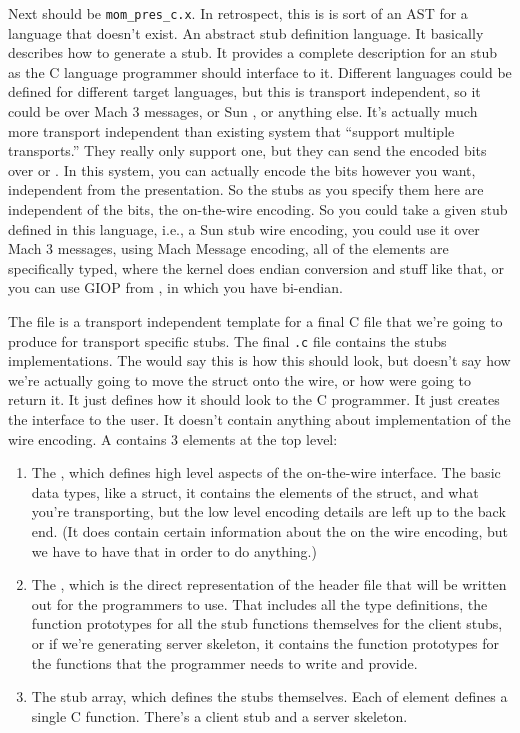 Next should be \texttt{mom\_pres\_c.x}.  In retrospect, this is is sort of an
AST for a language that doesn't exist.  An abstract stub definition language.
It basically describes how to generate a stub.  It provides a complete
description for an \RPC{} stub as the C language programmer should interface to
it.  Different languages could be defined for different target languages, but
this is transport independent, so it could be over \TCP{} Mach 3 messages, or Sun
\RPC{}, or anything else.  It's actually much more transport independent than
existing \RPC{} system that ``support multiple transports.''  They really only
support one, but they can send the encoded bits over \TCP{} or \UDP{}\@.  In this
system, you can actually encode the bits however you want, independent from the
presentation.  So the stubs as you specify them here are independent of the
bits, the on-the-wire encoding.  So you could take a given stub defined in this
language, i.e., a Sun \RPC{} stub wire encoding, you could use it over Mach 3
messages, using Mach Message encoding, all of the elements are specifically
typed, where the kernel does endian conversion and stuff like that, or you can
use GIOP from \CORBA{}, in which you have bi-endian.

The \PRESC{} file is a transport independent template for a final C file
that we're going to produce for transport specific stubs.  The final
\texttt{.c} file contains the stubs implementations.  The \PRESC{} would say this
is how this should look, but doesn't say how we're actually going to
move the struct onto the wire, or how were going to return it.  It
just defines how it should look to the C programmer.  It just
creates the interface to the user.  It doesn't contain anything about
implementation of the wire encoding.  A \PRESC{} contains 3 elements at
the top level:

\begin{enumerate}
  \item The \MINT{}, which defines high level aspects of the on-the-wire
  interface.  The basic data types, like a struct, it contains the elements of
  the struct, and what you're transporting, but the low level encoding details
  are left up to the back end.  (It does contain certain information about the
  on the wire encoding, but we have to have that in order to do anything.)

  \item The \CAST{}, which is the direct representation of the header file that
  will be written out for the programmers to use.  That includes all the type
  definitions, the function prototypes for all the stub functions themselves
  for the client stubs, or if we're generating server skeleton, it contains the
  function prototypes for the functions that the programmer needs to write and
  provide.

  \item The stub array, which defines the stubs themselves.  Each of element
  defines a single C function.  There's a client stub and a server skeleton.
\end{enumerate}

